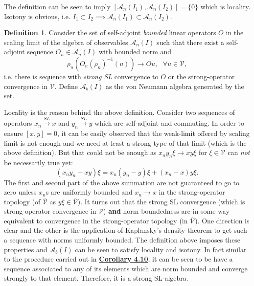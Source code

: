 \documentclass[twoside,11pt,titlepage]{amsart}
\renewcommand{\=}[1]{\stackrel{#1}{=}} %
\theoremstyle{definition}
\newtheorem{dfn}{Definition}
\theoremstyle{remark}
\begin{document}
The definition can be seen to imply $[\mathcal{A}_n(I_1),\mathcal{A}_n(I_2)]=\{0\}$ which is locality. Isotony is obvious, i.e. $I_1 \subset I_2 \implies \mathcal{A}_n(I_1) \subset \mathcal{A}_n(I_2)$.
\begin{dfn}\label{dfn14}
Consider the set of self-adjoint \textit{bounded} linear operators $O$ in the scaling limit of the algebra of observables $\mathcal{A}_n(I)$ such that there exist a self-adjoint sequence $ O_n \in \mathcal{A}_n(I)$ with bounded norm and
$$\rho_n(O_n(\rho_n)^{-1}(u)) \rightarrow Ou,\ \ \ \forall u \in \mathcal{V},$$
i.e. there is sequence with \textit{strong SL} convergence to $O$ or the strong-operator convergence in $\mathcal{V}$. Define $\mathcal{A}_b(I)$ as the von Neumann algebra generated by the set.
\end{dfn}
Locality is the reason behind the above definition. Consider two sequences of operators $x_n \xrightarrow{SL} x$ and $y_n \xrightarrow{SL} y$ which are self-adjoint and commuting. In order to ensure $[x,y]=0$, it can be easily observed that the weak-limit offered by scaling limit is not enough and we need at least a strong type of that limit (which is the above definition). But that could not be enough as $x_ny_n\xi \to xy\xi$ for $\xi \in \mathcal{V}$ can \textit{not} be necessarily true yet:
$$(x_ny_n-xy)\xi=x_n(y_n-y)\xi+(x_n-x)y\xi.$$
The first and second part of the above summation are not guaranteed to go to zero unless $x_n$s are uniformly bounded and $x_n \to x$ in the strong-operator topology (of $\overline{\mathcal{V}}$ as $y\xi \in \overline{\mathcal{V}}$). It turns out that the strong SL convergence (which is strong-operator convergence in $\mathcal{V}$) \textbf{and} norm boundedness are in some way equivalent to convergence in the strong-operator topology (in $\overline{\mathcal{V}}$). One direction is clear and the other is the application of Kaplansky's density theorem to get such a sequence with norms uniformly bounded. The definition above imposes these properties and $\mathcal{A}_b(I)$ can be seen to satisfy locality and isotony. In fact similar to the procedure carried out in \hyperref[cor4.10]{\textbf{Corollary 4.10}}, it can be seen to be have a sequence associated to any of its elements which are norm bounded and converge strongly to that element. Therefore, it is a strong SL-algebra.
\end{document}
